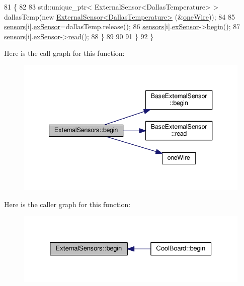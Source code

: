 \begin{DoxyCode}
81         \{
82 
83             std::unique\_ptr< ExternalSensor<DallasTemperature> > dallasTemp(\textcolor{keyword}{new} 
      \hyperlink{class_external_sensor_3_01_dallas_temperature_01_4}{ExternalSensor<DallasTemperature>} (&\hyperlink{_external_sensors_8cpp_af39fa3dad1ba161b384c0b26b8145e65}{oneWire}));
84              
85             \hyperlink{class_external_sensors_a284233f884fcf00154a44740cf1d9e1e}{sensors}[i].\hyperlink{struct_external_sensors_1_1sensor_a9bca150fd468b8d0e090e6d72c5c2b48}{exSensor}=dallasTemp.release();
86             \hyperlink{class_external_sensors_a284233f884fcf00154a44740cf1d9e1e}{sensors}[i].\hyperlink{struct_external_sensors_1_1sensor_a9bca150fd468b8d0e090e6d72c5c2b48}{exSensor}->\hyperlink{class_base_external_sensor_a87d132803d4f4fdd4e66332809f0c9a0}{begin}();
87             \hyperlink{class_external_sensors_a284233f884fcf00154a44740cf1d9e1e}{sensors}[i].\hyperlink{struct_external_sensors_1_1sensor_a9bca150fd468b8d0e090e6d72c5c2b48}{exSensor}->\hyperlink{class_base_external_sensor_a1564f16deacf57b51b9948ac29db4291}{read}();
88         \}
89         
90         
91     \}
92 \}
\end{DoxyCode}
Here is the call graph for this function\+:\nopagebreak
\begin{figure}[H]
\begin{center}
\leavevmode
\includegraphics[width=340pt]{d1/d2f/class_external_sensors_a58ede0d786a86417254708870f04a21e_cgraph}
\end{center}
\end{figure}
Here is the caller graph for this function\+:\nopagebreak
\begin{figure}[H]
\begin{center}
\leavevmode
\includegraphics[width=326pt]{d1/d2f/class_external_sensors_a58ede0d786a86417254708870f04a21e_icgraph}
\end{center}
\end{figure}
\mbox{\label{class_external_sensors_a862a4bd11346b37270d0244c2adabe5a}} 
